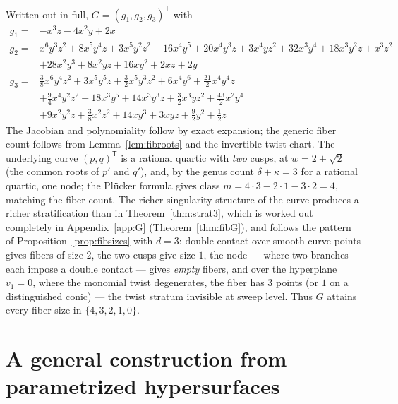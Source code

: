 \documentclass[11pt]{article}
\numberwithin{equation}{section}
\theoremstyle{plain}
\theoremstyle{definition}
\theoremstyle{remark}
\begin{document}
Written out in full, $G=(g_1,g_2,g_3)^{\mathsf T}$ with
{\small
\begin{align*}
g_1 ={}& -x^3z-4x^2y+2x\\[2pt]
g_2 ={}& x^6y^3z^2+8x^5y^4z+3x^5y^2z^2+16x^4y^5+20x^4y^3z+3x^4yz^2+32x^3y^4+18x^3y^2z+x^3z^2\\
&+28x^2y^3+8x^2yz+16xy^2+2xz+2y\\[2pt]
g_3 ={}& \tfrac{3}{8}x^6y^4z^2+3x^5y^5z+\tfrac{3}{2}x^5y^3z^2+6x^4y^6+\tfrac{21}{2}x^4y^4z\\
&+\tfrac{9}{4}x^4y^2z^2+18x^3y^5+14x^3y^3z+\tfrac{3}{2}x^3yz^2+\tfrac{43}{2}x^2y^4\\
&+9x^2y^2z+\tfrac{3}{8}x^2z^2+14xy^3+3xyz+\tfrac{9}{2}y^2+\tfrac{1}{2}z
\end{align*}
}
The Jacobian and polynomiality follow by exact expansion; the generic
fiber count follows from Lemma~\ref{lem:fibroots} and the invertible twist chart. The underlying curve $(p,q)^{\mathsf T}$ is a rational quartic with
\emph{two} cusps, at $w=2\pm\sqrt2$ (the common roots of $p'$ and $q'$), and, by
the genus count $\delta+\kappa=3$ for a rational quartic, one node; the Pl\"ucker
formula gives class $m=4\cdot3-2\cdot1-3\cdot2=4$, matching the fiber count. The
richer singularity structure of the curve produces a richer stratification than in
Theorem~\ref{thm:strat3}, which is worked out completely in
Appendix~\ref{app:G} (Theorem~\ref{thm:fibG}), and follows the pattern of
Proposition~\ref{prop:fibsizes} with $d=3$: double contact over smooth curve
points gives fibers of size $2$, the two cusps give size $1$, the node --- where
two branches each impose a double contact --- gives \emph{empty} fibers, and over
the hyperplane $v_1=0$, where the monomial twist degenerates, the fiber has
$3$ points (or $1$ on a distinguished conic) --- the twist stratum invisible at
sweep level. Thus $G$ attains every fiber size in $\{4,3,2,1,0\}$.

\section{A general construction from parametrized hypersurfaces}\label{sec:dim4}
\end{document}
